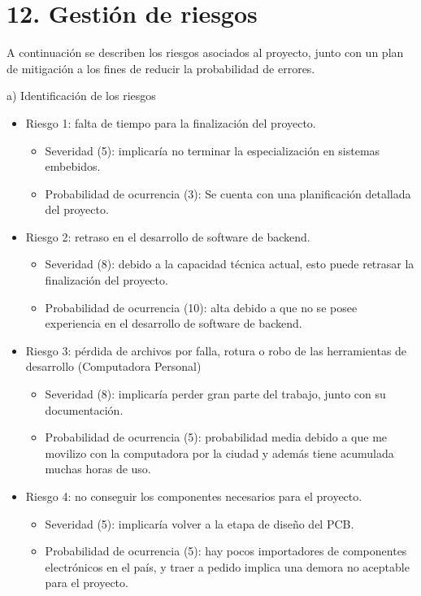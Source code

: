 \documentclass[11pt]{charter}
\begin{document}
\section{12. Gestión de riesgos}
\label{sec:riesgos}

A continuación se describen los riesgos asociados al proyecto, junto con un plan de mitigación a los fines de reducir la probabilidad de errores.

a) Identificación de los riesgos

\begin{itemize}
\item Riesgo 1: falta de tiempo para la finalización del proyecto.
	\begin{itemize}
	\item Severidad (5): implicaría no terminar la especialización en sistemas embebidos.
	\item Probabilidad de ocurrencia (3): Se cuenta con una planificación detallada del proyecto. 
	\end{itemize} 

\item Riesgo 2: retraso en el desarrollo de software de backend.
	\begin{itemize}
	\item Severidad (8): debido a la capacidad técnica actual, esto puede retrasar la finalización del proyecto.
	\item Probabilidad de ocurrencia (10): alta debido a que no se posee experiencia en el desarrollo de software de backend. 
	\end{itemize}
	
\item Riesgo 3: pérdida de archivos por falla, rotura o robo de las herramientas de desarrollo (Computadora Personal)
	\begin{itemize}
	\item Severidad (8): implicaría perder gran parte del trabajo, junto con su documentación.
	\item Probabilidad de ocurrencia (5): probabilidad media debido a que me movilizo con la computadora por la ciudad y además tiene acumulada muchas horas de uso.
	\end{itemize}
	
\item Riesgo 4: no conseguir los componentes necesarios para el proyecto.
	\begin{itemize}
	\item Severidad (5): implicaría volver a la etapa de diseño del PCB.
	\item Probabilidad de ocurrencia (5): hay pocos importadores de componentes electrónicos en el país, y traer a pedido implica una demora no aceptable para el proyecto.
	\end{itemize}
	

\end{itemize}
\end{document}
